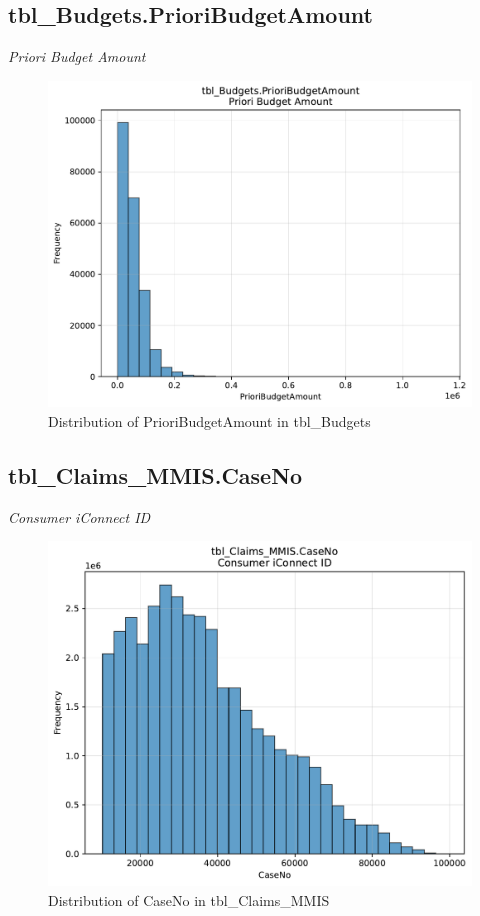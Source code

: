 \subsection{tbl\_Budgets.PrioriBudgetAmount}
\textit{Priori Budget Amount}

\begin{figure}[htbp]
\centering
\includegraphics[width=\textwidth]{figures/dbo_tbl_Budgets_PrioriBudgetAmount.pdf}
\caption{Distribution of PrioriBudgetAmount in tbl\_Budgets}
\end{figure}\newpage

\subsection{tbl\_Claims\_MMIS.CaseNo}
\textit{Consumer iConnect ID}

\begin{figure}[htbp]
\centering
\includegraphics[width=\textwidth]{figures/dbo_tbl_Claims_MMIS_CaseNo.pdf}
\caption{Distribution of CaseNo in tbl\_Claims\_MMIS}
\end{figure}\newpage

